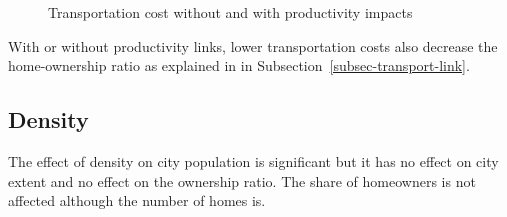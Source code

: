 {\begin{figure}[h!tb]
    \caption{Transportation cost without and with productivity impacts}
    \label{fig:Productivity_link_W-WO-transportation-cost}
\end{figure}
With or without productivity links, lower transportation costs also decrease the home-ownership ratio as explained in in Subsection~\ref{subsec-transport-link}. 



\newpage
\subsection{Density}

The effect of density on city population is significant but it has no effect on city extent and no effect on the ownership ratio. The share of homeowners is not affected although the number of homes is. 

}
